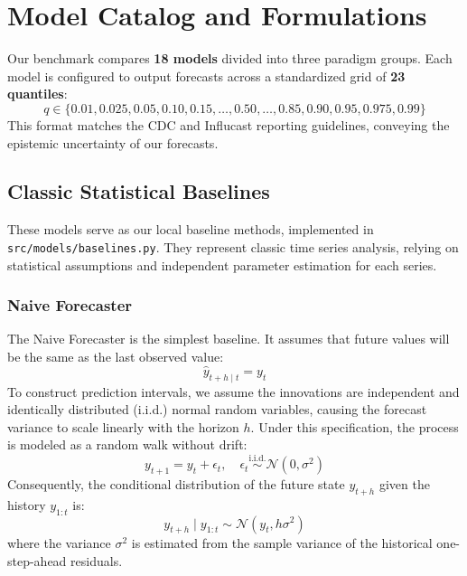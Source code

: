 
\section{Model Catalog and Formulations}

Our benchmark compares \textbf{18 models} divided into three paradigm groups. Each model is configured to output forecasts across a standardized grid of \textbf{23 quantiles}:
\begin{equation}
q \in \{0.01, 0.025, 0.05, 0.10, 0.15, \dots, 0.50, \dots, 0.85, 0.90, 0.95, 0.975, 0.99\}
\end{equation}
This format matches the CDC and Influcast reporting guidelines, conveying the epistemic uncertainty of our forecasts.

\subsection{Classic Statistical Baselines}
These models serve as our local baseline methods, implemented in \texttt{src/models/baselines.py}. They represent classic time series analysis, relying on statistical assumptions and independent parameter estimation for each series.

\subsubsection{Naive Forecaster}
The Naive Forecaster is the simplest baseline. It assumes that future values will be the same as the last observed value:
\begin{equation}
\hat{y}_{t+h\mid t} = y_t
\end{equation}
To construct prediction intervals, we assume the innovations are independent and identically distributed (i.i.d.) normal random variables, causing the forecast variance to scale linearly with the horizon $h$. Under this specification, the process is modeled as a random walk without drift:
\begin{equation}
y_{t+1} = y_t + \epsilon_t, \quad \epsilon_t \overset{\text{i.i.d.}}{\sim} \mathcal{N}(0, \sigma^2)
\end{equation}
Consequently, the conditional distribution of the future state $y_{t+h}$ given the history $y_{1:t}$ is:
\begin{equation}
y_{t+h} \mid y_{1:t} \sim \mathcal{N}(y_t, h \sigma^2)
\end{equation}
where the variance $\sigma^2$ is estimated from the sample variance of the historical one-step-ahead residuals.

